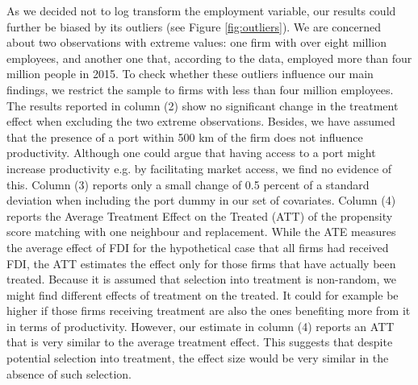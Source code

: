 \documentclass[a4paper,11pt]{scrartcl}
\begin{document}
As we decided not to log transform the employment variable, our results could further be biased by its outliers (see Figure \ref{fig:outliers}). %
We are %
concerned about two observations with extreme values: one firm with over eight million employees, and another one that, according to the data, employed more than four million people in 2015. To check whether these outliers influence our main findings, we restrict the sample to firms with less than four million employees. The results reported in column (2) show no significant change in the treatment effect when excluding the two extreme observations. Besides, we have assumed that the presence of a port within 500 km of the firm does not influence productivity. Although one could argue that having access to a port might increase productivity e.g. by facilitating market access, we find no evidence of this.  Column (3) reports only a small change of 0.5 percent of a standard deviation when including the port dummy in our set of covariates. 
Column (4) reports the Average Treatment Effect on the Treated (ATT) of the propensity score matching with one neighbour and replacement. While the ATE measures the average effect of FDI for the hypothetical case that all firms had received FDI, the ATT estimates the effect only for those firms that have actually been treated. Because it is assumed that selection into treatment is non-random, we might find different effects of treatment on the treated. It could for example be higher if those firms receiving treatment are also the ones benefiting more from it in terms of productivity.
 However, our estimate in column (4) reports an ATT that is very similar to the average treatment effect. This suggests that %
 despite potential %
 selection into treatment, the effect size would be very similar in the absence of such selection. 
\end{document}
